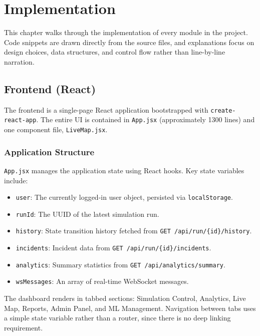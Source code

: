 \chapter{Implementation}
\label{ch:implementation}

This chapter walks through the implementation of every module in the project. Code snippets are drawn directly from the source files, and explanations focus on design choices, data structures, and control flow rather than line-by-line narration.

\section{Frontend (React)}
\label{sec:impl_frontend}

The frontend is a single-page React application bootstrapped with \texttt{create-react-app}. The entire UI is contained in \texttt{App.jsx} (approximately 1300 lines) and one component file, \texttt{LiveMap.jsx}.

\subsection{Application Structure}

\texttt{App.jsx} manages the application state using React hooks. Key state variables include:

\begin{itemize}[leftmargin=*]
    \item \texttt{user}: The currently logged-in user object, persisted via \texttt{localStorage}.
    \item \texttt{runId}: The UUID of the latest simulation run.
    \item \texttt{history}: State transition history fetched from \texttt{GET /api/run/\{id\}/history}.
    \item \texttt{incidents}: Incident data from \texttt{GET /api/run/\{id\}/incidents}.
    \item \texttt{analytics}: Summary statistics from \texttt{GET /api/analytics/summary}.
    \item \texttt{wsMessages}: An array of real-time WebSocket messages.
\end{itemize}

The dashboard renders in tabbed sections: Simulation Control, Analytics, Live Map, Reports, Admin Panel, and ML Management. Navigation between tabs uses a simple state variable rather than a router, since there is no deep linking requirement.

